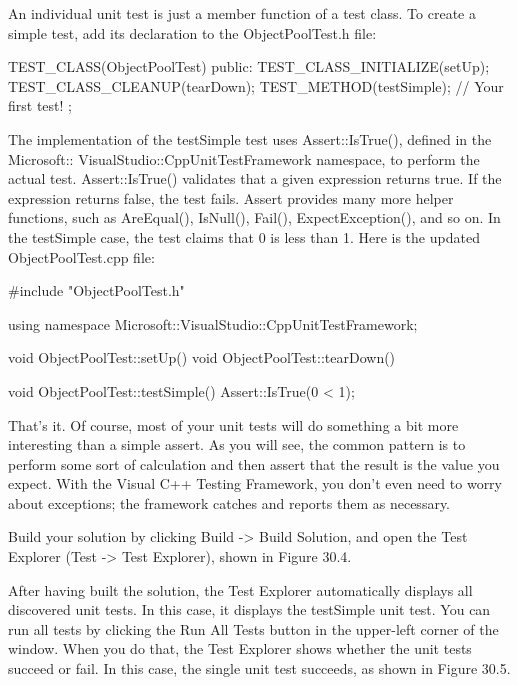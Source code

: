 An individual unit test is just a member function of a test class. To create a simple test, add its declaration to the ObjectPoolTest.h file:

\begin{cpp}
TEST_CLASS(ObjectPoolTest)
{
    public:
        TEST_CLASS_INITIALIZE(setUp);
        TEST_CLASS_CLEANUP(tearDown);
        TEST_METHOD(testSimple); // Your first test!
};
\end{cpp}

The implementation of the testSimple test uses Assert::IsTrue(), defined in the Microsoft:: VisualStudio::CppUnitTestFramework namespace, to perform the actual test. Assert::IsTrue() validates that a given expression returns true. If the expression returns false, the test fails. Assert provides many more helper functions, such as AreEqual(), IsNull(), Fail(), ExpectException(), and so on. In the testSimple case, the test claims that 0 is less than 1. Here is the updated ObjectPoolTest.cpp file:

\begin{cpp}
#include "ObjectPoolTest.h"

using namespace Microsoft::VisualStudio::CppUnitTestFramework;

void ObjectPoolTest::setUp() { }
void ObjectPoolTest::tearDown() { }

void ObjectPoolTest::testSimple()
{
    Assert::IsTrue(0 < 1);
}
\end{cpp}

That’s it. Of course, most of your unit tests will do something a bit more interesting than a simple assert. As you will see, the common pattern is to perform some sort of calculation and then assert that the result is the value you expect. With the Visual C++ Testing Framework, you don’t even need to worry about exceptions; the framework catches and reports them as necessary.


Build your solution by clicking Build -> Build Solution, and open the Test Explorer (Test -> Test Explorer), shown in Figure 30.4.


After having built the solution, the Test Explorer automatically displays all discovered unit tests. In this case, it displays the testSimple unit test. You can run all tests by clicking the Run All Tests button in the upper-left corner of the window. When you do that, the Test Explorer shows whether the unit tests succeed or fail. In this case, the single unit test succeeds, as shown in Figure 30.5.

